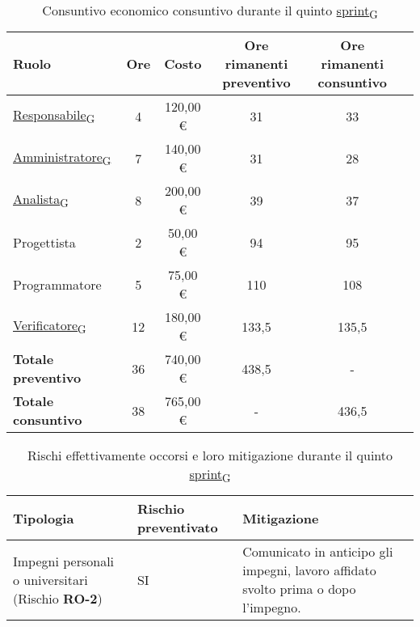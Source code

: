  \begin{table}[!h]
     \centering
     \begin{tabular}{ | l | c | c | c | c | c | }
         \hline
         \textbf{Ruolo} & \textbf{Ore} & \textbf{Costo} & \textbf{Ore rimanenti preventivo} & \textbf{Ore rimanenti consuntivo} \\
         \hline
         \href{https://7last.github.io/docs/rtb/documentazione-interna/glossario\#responsabile}{Responsabile\textsubscript{G}}               &  4   &    120,00 € &   31   &   33   \\
         \href{https://7last.github.io/docs/rtb/documentazione-interna/glossario\#amministratore}{Amministratore\textsubscript{G}}             &  7   &    140,00 € &   31   &   28   \\
         \href{https://7last.github.io/docs/rtb/documentazione-interna/glossario\#analista}{Analista\textsubscript{G}}                   &  8   &    200,00 € &   39   &   37   \\
         Progettista                &  2   &    50,00 € &   94   &   95   \\
         Programmatore              &  5   &    75,00 € &   110   &   108   \\
         \href{https://7last.github.io/docs/rtb/documentazione-interna/glossario\#verificatore}{Verificatore\textsubscript{G}}               &  12   &    180,00 € &   133,5   &   135,5   \\
         \hline
         \textbf{Totale preventivo} &  36   &    740,00 € &   438,5   &   -   \\
         \hline
         \textbf{Totale consuntivo} &  38   &    765,00 € &   -   &   436,5   \\
         \hline
     \end{tabular}
     \caption{Consuntivo economico consuntivo durante il quinto \href{https://7last.github.io/docs/rtb/documentazione-interna/glossario\#sprint}{sprint\textsubscript{G}}}
 \end{table}
\newpage
 \begin{table}[!h]
     \centering
     \begin{tabular}{ | p{6cm} | p{2.5cm} | p{7.5cm} | }
         \hline
         \textbf{Tipologia} & \textbf{Rischio preventivato} & \textbf{Mitigazione}  \\
         \hline
         Impegni personali o universitari (Rischio \textbf{RO-2})& SI & Comunicato in anticipo gli impegni, lavoro affidato svolto prima o dopo l'impegno.\\
         \hline
     \end{tabular}
     \caption{Rischi effettivamente occorsi e loro mitigazione durante il quinto \href{https://7last.github.io/docs/rtb/documentazione-interna/glossario\#sprint}{sprint\textsubscript{G}}} %

 \end{table}

